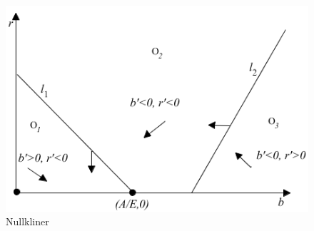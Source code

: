 \begin{figure} [H]
    \centering
    \includegraphics[scale=0.8]{Images/LoVae.png}
    \caption{Nullkliner \citep[s. 259]{Svensk}}
    \label{nulllovae}
\end{figure}

